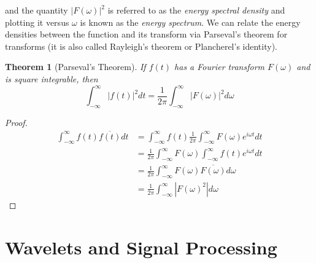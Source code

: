 \documentclass{report}
\newtheorem{theorem}{Theorem}[chapter]
\theoremstyle{definition}
\theoremstyle{remark}
\begin{document}
and the quantity $|F(\omega)|^2$ is referred to as the \textit{energy spectral density} and plotting it versus $\omega$ is known as the \textit{energy spectrum}. We can relate the energy densities between the function and its transform via Parseval's theorem for transforms (it is also called Rayleigh's theorem or Plancherel's identity).
\begin{theorem}[Parseval's Theorem]
    If $f(t)$ has a Fourier transform $F(\omega)$ and is square integrable, then 
    \begin{equation*}
        \int^\infty_{-\infty}|f(t)|^2 dt = \frac{1}{2\pi}\int^\infty_{-\infty}|F(\omega)|^2d\omega
    \end{equation*}
\end{theorem}
\begin{proof}
    \begin{equation*}
        \begin{split}
            \int^\infty_{-\infty}f(t)\overline{f(t)}dt &= \int^\infty_{-\infty}f(t)\frac{1}{2\pi}\int^\infty_{-\infty}F(\omega)e^{i\omega t}dt \\
            &=\frac{1}{2\pi}\int^\infty_{-\infty}F(\omega)\int^\infty_{-\infty}f(t)e^{i\omega t}dt \\
            &=\frac{1}{2\pi}\int^\infty_{-\infty}F(\omega)\overline{F(\omega)}d\omega\\
            &=\frac{1}{2\pi}\int^\infty_{-\infty}|F(\omega)^2|d\omega
        \end{split}
    \end{equation*}
\end{proof}








\chapter{Wavelets and Signal Processing}
\end{document}

